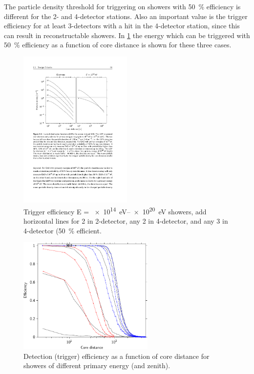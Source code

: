 The particle density threshold for triggering on showers with \SI{50}{\percent} efficiency is different for the 2- and 4-detector stations. Also an important value is the trigger efficiency for at least 3-detectors with a hit in the 4-detector station, since this can result in reconstructable showers. In \cref{fig:ldf_energies2} the energy which can be triggered with \SI{50}{\percent} efficiency as a function of core distance is shown for these three cases.

\begin{figure}
    \centering
    \includegraphics[width=0.5\textwidth]
                    {plots/experiment/ldf_energies}
    \caption{Trigger efficiency E = \SIrange{e14}{e20}{\eV} showers, add horizontal lines for 2 in 2-detector, any 2 in 4-detector, and any 3 in 4-detector (\SI{50}{\percent} efficient.}
    \label{fig:ldf_energies2}
\end{figure}

\begin{figure}
    \centering
    \includegraphics[width=0.6\textwidth]
                    {plots/experiment/efficiency_two_16}
    \caption{Detection (trigger) efficiency as a function of core distance for showers of different primary energy (and zenith).}
    \label{fig:efficiency_two_16}
\end{figure}

